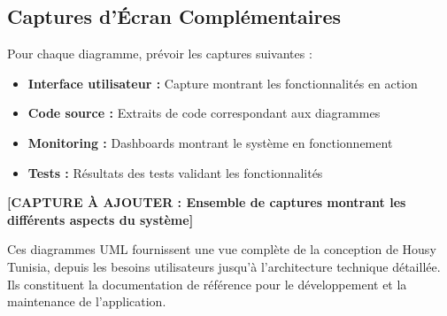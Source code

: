 \subsection{Captures d'Écran Complémentaires}

Pour chaque diagramme, prévoir les captures suivantes :

\begin{itemize}
    \item \textbf{Interface utilisateur :} Capture montrant les fonctionnalités en action
    \item \textbf{Code source :} Extraits de code correspondant aux diagrammes
    \item \textbf{Monitoring :} Dashboards montrant le système en fonctionnement
    \item \textbf{Tests :} Résultats des tests validant les fonctionnalités
\end{itemize}

\textbf{[CAPTURE À AJOUTER : Ensemble de captures montrant les différents aspects du système]}

\begin{resultbox}
Ces diagrammes UML fournissent une vue complète de la conception de Housy Tunisia, depuis les besoins utilisateurs jusqu'à l'architecture technique détaillée. Ils constituent la documentation de référence pour le développement et la maintenance de l'application.
\end{resultbox}
